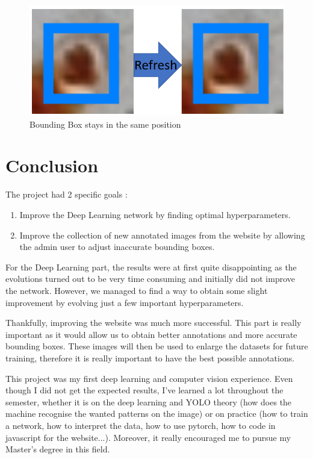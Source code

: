 \documentclass{article}
\begin{document}
\begin{figure}[!ht]
  \centering
  \includegraphics[scale=0.9]{features/nomove.PNG}
  \caption{Bounding Box stays in the same position}
  \label{Figure 32}
\end{figure}

\newpage

\section{Conclusion}

The project had 2 specific goals : 
\begin{enumerate}
    \item Improve the Deep Learning network by finding optimal hyperparameters.
    \item Improve the collection of new annotated images from the website by allowing the admin user to adjust inaccurate bounding boxes.
\end{enumerate}

\bigskip

For the Deep Learning part, the results were at first quite disappointing as the evolutions turned out to be very time consuming and initially did not improve the network. However, we managed to find a way to obtain some slight improvement by evolving just a few important hyperparameters.

\bigskip

Thankfully, improving the website was much more successful.  This part is really important as it would allow us to obtain better annotations and more accurate bounding boxes.  These images will then be used to enlarge the datasets for future training, therefore it is really important to have the best possible annotations. 

\bigskip

This project was my first deep learning and computer vision experience. Even though I did not get the expected results, I've learned a lot throughout the semester, whether it is on the deep learning and YOLO theory (how does the machine recognise the wanted patterns on the image) or on practice (how to train a network, how to interpret the data, how to use pytorch, how to code in javascript for the website...). Moreover, it really encouraged me to pursue my Master's degree in this field.
\end{document}
